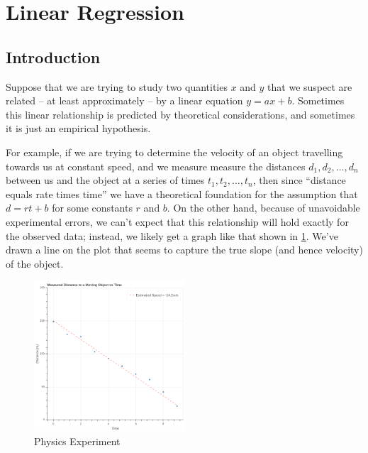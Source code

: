 \documentclass[]{article}
\date{}
\begin{document}
\newcommand{\df}[1]{\frac{\partial}{\partial #1}}

\hypertarget{linear-regression}{%
\section{Linear Regression}\label{linear-regression}}

\hypertarget{sec:Intro}{%
\subsection{Introduction}\label{sec:Intro}}

Suppose that we are trying to study two quantities \(x\) and \(y\) that
we suspect are related -- at least approximately -- by a linear equation
\(y=ax+b\). Sometimes this linear relationship is predicted by
theoretical considerations, and sometimes it is just an empirical
hypothesis.

For example, if we are trying to determine the velocity of an object
travelling towards us at constant speed, and we measure measure the
distances \(d_1, d_2, \ldots, d_n\) between us and the object at a
series of times \(t_1, t_2, \ldots, t_n\), then since ``distance equals
rate times time'' we have a theoretical foundation for the assumption
that \(d=rt+b\) for some constants \(r\) and \(b\). On the other hand,
because of unavoidable experimental errors, we can't expect that this
relationship will hold exactly for the observed data; instead, we likely
get a graph like that shown in \cref{fig:dvt}. We've drawn a line on the
plot that seems to capture the true slope (and hence velocity) of the
object.

\begin{figure}
\hypertarget{fig:dvt}{%
\centering
\includegraphics[width=0.5\textwidth,height=\textheight]{../img/distance-vs-time.png}
\caption{Physics Experiment}\label{fig:dvt}
}
\end{figure}
\end{document}
